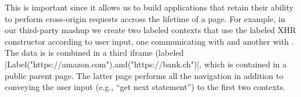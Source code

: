 This is important since it allows us to build applications that retain
their ability to perform cross-origin requests accross the lifetime of
a page.
%
For example, in our third-party mashup we create two labeled contexts
that use the labeled XHR constructor according to user input, one
communicating with  and another with
.
%
The data is is combined in a third iframe (labeled
\js|Label("https://amazon.com").and("https://bank.ch")|, which is
contained in a public parent page.
%
The latter page performs all the navigation in addition to conveying
the user input (e.g., ``get next statement'') to the first two
contexts.



